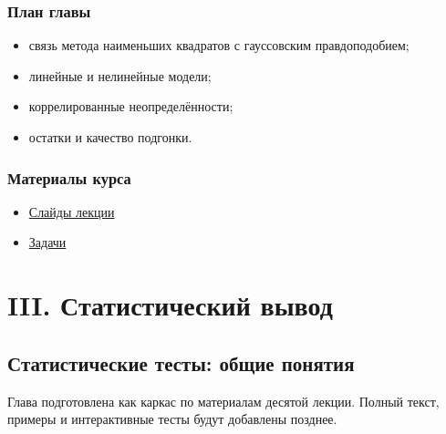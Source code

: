 \documentclass[
  russian,
  12pt,
  a4paper,
  a4paper,
  openany]{scrbook}
\providecommand{\tightlist}{%
  \setlength{\itemsep}{0pt}\setlength{\parskip}{0pt}}
\begin{document}
\section{План
главы}\label{ux43fux43bux430ux43d-ux433ux43bux430ux432ux44b-7}

\begin{itemize}
\tightlist
\item
  связь метода наименьших квадратов с гауссовским правдоподобием;
\item
  линейные и нелинейные модели;
\item
  коррелированные неопределённости;
\item
  остатки и качество подгонки.
\end{itemize}

\section{Материалы
курса}\label{ux43cux430ux442ux435ux440ux438ux430ux43bux44b-ux43aux443ux440ux441ux430-6}

\begin{itemize}
\tightlist
\item
  \href{https://neutrinohit.github.io/statistical-analysis-course/ru/slides/08_method_of_least_squares.html}{Слайды
  лекции}
\item
  \href{https://neutrinohit.github.io/statistical-analysis-course/ru/slides/exercises/08_method_of_least_squares_exercises.html}{Задачи}
\end{itemize}

\part{III. Статистический вывод}

\chapter{Статистические тесты: общие
понятия}\label{ux441ux442ux430ux442ux438ux441ux442ux438ux447ux435ux441ux43aux438ux435-ux442ux435ux441ux442ux44b-ux43eux431ux449ux438ux435-ux43fux43eux43dux44fux442ux438ux44f}

\begin{bookchapteropening}

Глава подготовлена как каркас по материалам десятой лекции. Полный
текст, примеры и интерактивные тесты будут добавлены позднее.

\end{bookchapteropening}
\end{document}
